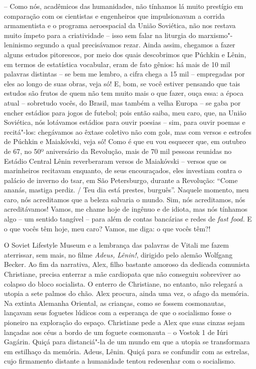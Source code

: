 -- Como nós, acadêmicos das humanidades, não tínhamos lá muito prestígio
em comparação com os cientistas e engenheiros que impulsionavam a
corrida armamentista e o programa aeroespacial da União Soviética, não
nos restava muito ímpeto para a criatividade -- isso sem falar na
liturgia do marxismo"-leninismo segundo a qual precisávamos rezar. Ainda
assim, chegamos a fazer alguns estudos pitorescos, por meio dos quais
descobrimos que Púchkin e Lênin, em termos de estatística vocabular,
eram de fato gênios: há mais de 10 mil palavras distintas -- se bem me
lembro, a cifra chega a 15 mil -- empregadas por eles ao longo de suas
obras, veja só! E, bom, se você estiver pensando que tais estudos são
frutos de quem não tem muito mais o que fazer, ouça essa: a época atual
-- sobretudo vocês, do Brasil, mas também a velha Europa -- se gaba por
encher estádios para jogos de futebol; pois então saiba, meu caro, que,
na União Soviética, nós lotávamos estádios para ouvir poesias -- sim,
para ouvir poemas e recitá"-los: chegávamos ao êxtase coletivo não com
gols, mas com versos e estrofes de Púchkin e Maiakóvski, veja só! Como é
que eu vou esquecer que, em outubro de 67, no 50º aniversário da
Revolução, mais de 70 mil pessoas reunidas no Estádio Central Lênin
reverberaram versos de Maiakóvski -- versos que os marinheiros recitavam
enquanto, de seus encouraçados, eles investiam contra o palácio de
inverno do tsar, em São Petersburgo, durante a Revolução: ``Come ananás,
mastiga perdiz. / Teu dia está prestes, burguês''. Naquele momento, meu
caro, nós acreditamos que a beleza salvaria o mundo. Sim, nós
acreditamos, nós acreditávamos! Vamos, me chame hoje de ingênuo e de
idiota, mas nós tínhamos algo -- um sentido tangível -- para além de
contas bancárias e redes de \emph{fast food.} E o que vocês têm hoje,
meu caro? Vamos, me diga: o que vocês têm?!

O Soviet Lifestyle Museum e a lembrança das palavras de Vitali me fazem
aterrissar, sem mais, no filme \emph{Adeus, Lênin!}, dirigido pelo
alemão Wolfgang Becker. Ao fim da narrativa, Alex, filho bastante
amoroso da dedicada comunista Christiane, precisa enterrar a mãe
cardiopata que não conseguiu sobreviver ao colapso do bloco socialista.
O enterro de Christiane, no entanto, não relegará a utopia a sete palmos
do chão. Alex procura, ainda uma vez, o afago da memória. Na extinta
Alemanha Oriental, as crianças, como se fossem cosmonautas, lançavam
seus foguetes lúdicos com a esperança de que o socialismo fosse o
pioneiro na exploração do espaço. Christiane pede a Alex que suas cinzas
sejam lançadas aos céus a bordo de um foguete cosmonauta -- o Vostok 1
de Iúri Gagárin. Quiçá para distanciá"-la de um mundo em que a utopia se
transformara em estilhaço da memória. Adeus, Lênin. Quiçá para se
confundir com as estrelas, cujo firmamento distante a humanidade tentou
redesenhar com o socialismo.

